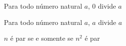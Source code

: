 \begin{exercise}
%
	Para todo número natural $a$, $0$ divide $a$
\end{exercise}

\begin{exercise}
%	
	Para todo número natural $a$, $a$ divide $a$
\end{exercise}

\begin{exercise}
%
	$n$ é par se e somente se $n^2$ é par
\end{exercise}
